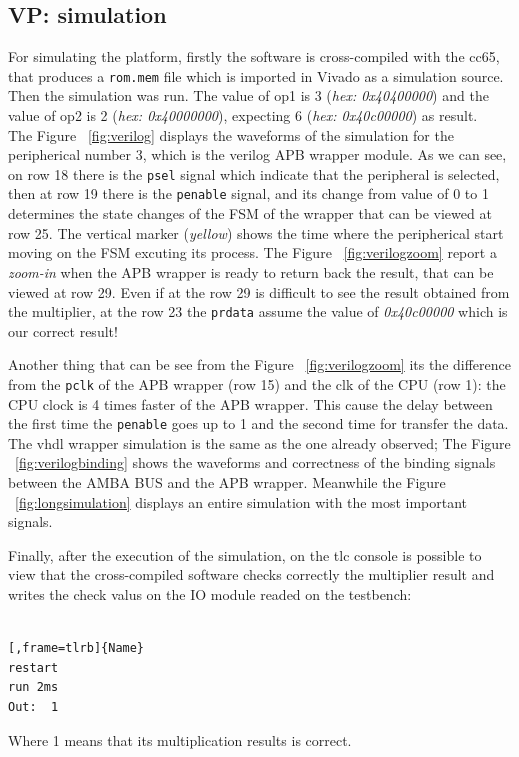 \documentclass[]{IEEEtran}
\begin{document}
\subsection{VP: simulation}
\label{sec:vphdlwrap}
For simulating the platform, firstly the software is cross-compiled with the cc65, that produces a \verb|rom.mem| file which is imported in Vivado as a simulation source. Then the simulation was run. 
The value of op1 is 3 (\textit{hex: 0x40400000}) and the value of op2 is 2 (\textit{hex: 0x40000000}), expecting 6 (\textit{hex: 0x40c00000}) as result.
\\

The Figure ~\ref{fig:verilog} displays the waveforms of the simulation for the peripherical number 3, which is the verilog APB wrapper module. As we can see, on row 18 there is the \verb|psel| signal which indicate that the peripheral is selected, then at row 19 there is the \verb|penable| signal, and its change from value of 0 to 1 determines the state changes of the FSM of the wrapper that can be viewed at row 25. The vertical marker (\textit{yellow}) shows the time where the peripherical start moving on the FSM excuting its process. 
The Figure ~\ref{fig:verilogzoom} report a \textit{zoom-in} when the APB wrapper is ready to return back the result, that can be viewed at row 29. Even if at the row 29 is difficult to see the result obtained from the multiplier, at the row 23 the \verb|prdata| assume the value of \textit{0x40c00000} which is our correct result!

Another thing that can be see from the Figure ~\ref{fig:verilogzoom} its the difference from the \verb|pclk| of the APB wrapper (row 15) and the clk of the CPU (row 1): the CPU clock is 4 times faster of the APB wrapper. This cause the delay between the first time the  \verb|penable|  goes up to 1 and the second time for transfer the data.
\\

The vhdl wrapper simulation is the same as the one already observed; The Figure ~\ref{fig:verilogbinding} shows the waveforms and correctness of the binding signals between the AMBA BUS and the APB wrapper. Meanwhile the Figure ~\ref{fig:longsimulation} displays an entire simulation with the most important signals.

Finally, after the execution of the simulation, on the tlc console is possible to view that the cross-compiled software checks correctly the multiplier result and writes the check valus on the IO module readed on the testbench:
\\
\\
\noindent
\begin{minipage}{.45\textwidth}
	\begin{lstlisting}[,frame=tlrb]{Name}
restart
run 2ms
Out:  1 
	\end{lstlisting}
\end{minipage}\hfill
Where 1 means that its multiplication results is correct.
\end{document}
